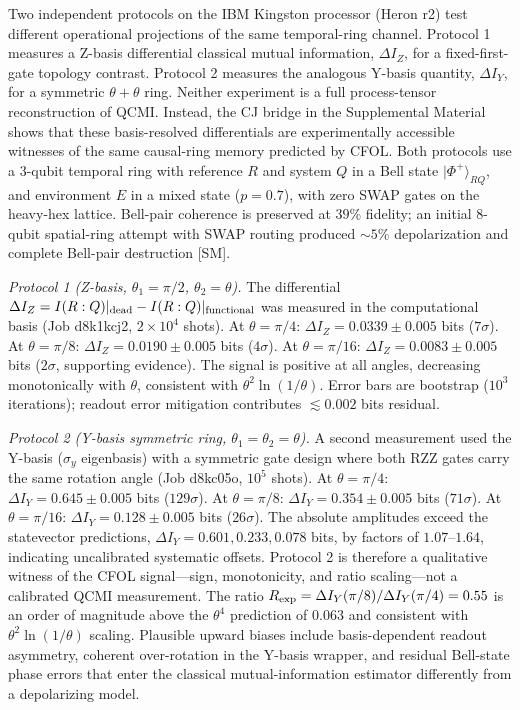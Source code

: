 \documentclass[twocolumn,aps,prl,floatfix]{revtex4-2}
\begin{document}
Two independent protocols on the IBM Kingston processor (Heron r2) test different operational projections of the same temporal-ring channel. Protocol 1 measures a Z-basis differential classical mutual information, $\Delta I_Z$, for a fixed-first-gate topology contrast. Protocol 2 measures the analogous Y-basis quantity, $\Delta I_Y$, for a symmetric $\theta+\theta$ ring. Neither experiment is a full process-tensor reconstruction of QCMI. Instead, the CJ bridge in the Supplemental Material shows that these basis-resolved differentials are experimentally accessible witnesses of the same causal-ring memory predicted by CFOL. Both protocols use a 3-qubit temporal ring with reference $R$ and system $Q$ in a Bell state $|\Phi^+\rangle_{RQ}$, and environment $E$ in a mixed state ($p=0.7$), with zero SWAP gates on the heavy-hex lattice. Bell-pair coherence is preserved at $39\%$ fidelity; an initial 8-qubit spatial-ring attempt with SWAP routing produced $\sim5\%$ depolarization and complete Bell-pair destruction [SM].

\textit{Protocol 1 (Z-basis, $\theta_1=\pi/2$, $\theta_2=\theta$).} The differential $\Delta I_Z = I(R:Q)|_{\rm dead} - I(R:Q)|_{\rm functional}$ was measured in the computational basis (Job d8k1kcj2, $2\times10^4$ shots). At $\theta=\pi/4$: $\Delta I_Z = 0.0339 \pm 0.005$ bits ($7\sigma$). At $\theta=\pi/8$: $\Delta I_Z = 0.0190 \pm 0.005$ bits ($4\sigma$). At $\theta=\pi/16$: $\Delta I_Z = 0.0083 \pm 0.005$ bits ($2\sigma$, supporting evidence). The signal is positive at all angles, decreasing monotonically with $\theta$, consistent with $\theta^2\ln(1/\theta)$. Error bars are bootstrap ($10^3$ iterations); readout error mitigation contributes $\lesssim0.002$ bits residual.

\textit{Protocol 2 (Y-basis symmetric ring, $\theta_1=\theta_2=\theta$).} A second measurement used the Y-basis ($\sigma_y$ eigenbasis) with a symmetric gate design where both RZZ gates carry the same rotation angle (Job d8kc05o, $10^5$ shots). At $\theta=\pi/4$: $\Delta I_Y = 0.645 \pm 0.005$ bits ($129\sigma$). At $\theta=\pi/8$: $\Delta I_Y = 0.354 \pm 0.005$ bits ($71\sigma$). At $\theta=\pi/16$: $\Delta I_Y = 0.128 \pm 0.005$ bits ($26\sigma$). The absolute amplitudes exceed the statevector predictions, $\Delta I_Y=0.601,0.233,0.078$ bits, by factors of $1.07$--$1.64$, indicating uncalibrated systematic offsets. Protocol 2 is therefore a qualitative witness of the CFOL signal---sign, monotonicity, and ratio scaling---not a calibrated QCMI measurement. The ratio $R_{\rm exp} = \Delta I_Y(\pi/8)/\Delta I_Y(\pi/4) = 0.55$ is an order of magnitude above the $\theta^4$ prediction of $0.063$ and consistent with $\theta^2\ln(1/\theta)$ scaling. Plausible upward biases include basis-dependent readout asymmetry, coherent over-rotation in the Y-basis wrapper, and residual Bell-state phase errors that enter the classical mutual-information estimator differently from a depolarizing model.
\end{document}
